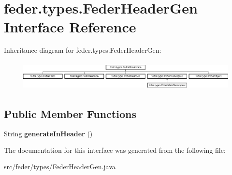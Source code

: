 \hypertarget{interfacefeder_1_1types_1_1FederHeaderGen}{}\section{feder.\+types.\+Feder\+Header\+Gen Interface Reference}
\label{interfacefeder_1_1types_1_1FederHeaderGen}
Inheritance diagram for feder.\+types.\+Feder\+Header\+Gen\+:\begin{figure}[H]
\begin{center}
\leavevmode
\includegraphics[height=1.555556cm]{interfacefeder_1_1types_1_1FederHeaderGen}
\end{center}
\end{figure}
\subsection*{Public Member Functions}
\begin{DoxyCompactItemize}
\item 
\mbox{\label{interfacefeder_1_1types_1_1FederHeaderGen_aed2748617e38cb2a10549d77216e39f7}} 
String {\bfseries generate\+In\+Header} ()
\end{DoxyCompactItemize}


The documentation for this interface was generated from the following file\+:\begin{DoxyCompactItemize}
\item 
src/feder/types/Feder\+Header\+Gen.\+java\end{DoxyCompactItemize}
